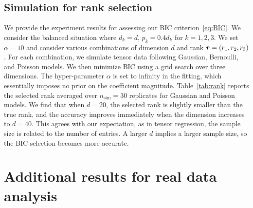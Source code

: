 \documentclass[11pt]{article}
\theoremstyle{plain}
\theoremstyle{definition}
\begin{document}
\subsection{Simulation for rank selection}
We provide the experiment results for assessing our BIC criterion~\eqref{eq:BIC}. We consider the balanced situation where $d_k=d$, $p_k=0.4d_k$ for $k=1,2,3$. We set $\alpha=10$ and consider various combinations of dimension $d$ and rank $\bm{r}=(r_1,r_2,r_3)$. For each combination, we simulate tensor data following Gaussian, Bernoulli, and Poisson models. We then minimize BIC using a grid search over three dimensions. The hyper-parameter $\alpha$ is set to infinity in the fitting, which essentially imposes no prior on the coefficient magnitude. Table~\ref{tab:rank} reports the selected rank averaged over $n_{\text{sim}}=30$ replicates for Gaussian and Poisson models. We find that when $d=20$, the selected rank is slightly smaller than the true rank, and the accuracy improves immediately when the dimension increases to $d=40$. This agrees with our expectation, as in tensor regression, the sample size is related to the number of entries. A larger $d$ implies a larger sample size, so the BIC selection becomes more accurate. 

\begin{table}[ht]
\centering
{}
\caption{Rank selection via BIC. Bold number indicates no significant difference between the estimate and the ground truth, based on a $z$-test with a level 0.05.}\label{tab:rank}
\end{table}

\section{Additional results for real data analysis}
\end{document}
